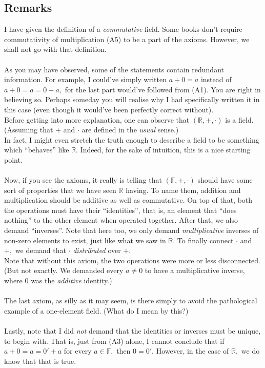 \documentclass[12pt]{article}
\begin{document}
\subsection{Remarks}
I have given the definition of a \emph{commutative} field. Some books don't require commutativity of multiplication (A5) to be a part of the axioms.  However, we shall not go with that definition. \\~\\
As you may have observed, some of the statements contain redundant information. For example, I could've simply written $a + 0 = a$ instead of $a + 0 = a = 0 + a,$ for the last part would've followed from (A1). You are right in believing so. Perhaps someday you will realise why I had specifically written it in this case (even though it would've been perfectly correct without).\\
Before getting into more explanation, one can observe that $(\mathbb{R}, +, \cdot)$ is a field. (Assuming that $+$ and $\cdot$ are defined in the \emph{usual} sense.)\\
In fact, I might even stretch the truth enough to describe a field to be something which ``behaves'' like $\mathbb{R}.$ Indeed, for the sake of intuition, this is a nice starting point.\\~\\
Now, if you see the axioms, it really is telling that $(\mathbb{F}, +, \cdot)$ should have some sort of properties that we have seen $\mathbb{R}$ having. To name them, addition and multiplication should be additive as well as commutative. On top of that, both the operations must have their ``identities'', that is, an element that ``does nothing'' to the other element when operated together. After that, we also demand ``inverses''. Note that here too, we only demand \emph{multiplicative} inverses of non-zero elements to exist, just like what we saw in $\mathbb{R}.$ To finally connect $\cdot$ and $+,$ we demand that $\cdot$ \emph{distributed} over $+.$\\
Note that without this axiom, the two operations were more or less disconnected. (But not exactly. We demanded every $a \neq 0$ to have a multiplicative inverse, where $0$ was the \emph{additive} identity.)\\~\\
The last axiom, as silly as it may seem, is there simply to avoid the pathological example of a one-element field. (What do I mean by this?)\\~\\
Lastly, note that I did \emph{not} demand that the identities or inverses must be unique, to begin with. That is, just from (A3) alone, I cannot conclude that if $a + 0 = a = 0' + a$ for every $a \in \mathbb{F},$ then $0 = 0'.$ However, in the case of $\mathbb{R},$ we do know that that is true.\\
\end{document}
